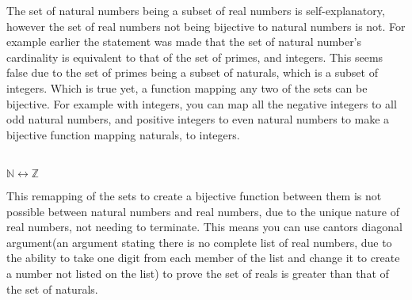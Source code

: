 \documentclass{article}
\begin{document}
\begin{large}
      The set of natural numbers being a subset of real numbers is self-explanatory, however the set of real numbers not being bijective to natural numbers is not.
For example earlier the statement was made that the set of natural number's cardinality is equivalent to that of the set of primes, and integers.
This seems false due to the set of primes being a subset of naturals, which is a subset of integers.
Which  is true yet, a function mapping any two of the sets can be bijective.
For example with integers, you can map all the negative integers to all odd natural numbers, and positive integers to even natural numbers to make a bijective function mapping naturals, to integers.
\\
\\
\begin{center}
  {\huge$ \mathbb{N} \leftrightarrow \mathbb{Z}$}
  \\
\end{center}

     This  remapping of the sets to create a bijective function between them is not possible between natural numbers and real numbers, due to the unique nature of real numbers, not needing to terminate.
This means you can use cantors diagonal argument(an argument stating there is no complete list of real numbers, due to the ability to take one digit from each member of the list and change it to create a number not listed on the list) to prove the set of reals is greater than that of the set of naturals.
\\


\end{large}
\end{document}
